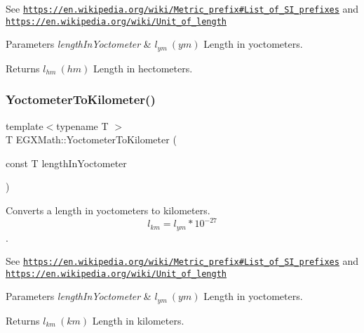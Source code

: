 See \href{https://en.wikipedia.org/wiki/Metric_prefix#List_of_SI_prefixes}{\tt https\+://en.\+wikipedia.\+org/wiki/\+Metric\+\_\+prefix\#\+List\+\_\+of\+\_\+\+S\+I\+\_\+prefixes} and \href{https://en.wikipedia.org/wiki/Unit_of_length}{\tt https\+://en.\+wikipedia.\+org/wiki/\+Unit\+\_\+of\+\_\+length} 
\begin{DoxyParams}{Parameters}
{\em length\+In\+Yoctometer} & $ l_{ym}\ (ym)$ Length in yoctometers. \\
\hline
\end{DoxyParams}
\begin{DoxyReturn}{Returns}
$ l_{hm}\ (hm)$ Length in hectometers. 
\end{DoxyReturn}
\mbox{\label{group___e_g_x_math-_conversions-_length_conversions-_yoctometer-_s_i_ga5736155a6aad5dc3b7b98706bda51484}} 
\subsubsection{\texorpdfstring{Yoctometer\+To\+Kilometer()}{YoctometerToKilometer()}}
{\footnotesize\ttfamily template$<$typename T $>$ \\
T E\+G\+X\+Math\+::\+Yoctometer\+To\+Kilometer (\begin{DoxyParamCaption}\item[{const T}]{length\+In\+Yoctometer }\end{DoxyParamCaption})}



Converts a length in yoctometers to kilometers. \[ l_{km}=l_{ym} * 10^{-27} \]. 

See \href{https://en.wikipedia.org/wiki/Metric_prefix#List_of_SI_prefixes}{\tt https\+://en.\+wikipedia.\+org/wiki/\+Metric\+\_\+prefix\#\+List\+\_\+of\+\_\+\+S\+I\+\_\+prefixes} and \href{https://en.wikipedia.org/wiki/Unit_of_length}{\tt https\+://en.\+wikipedia.\+org/wiki/\+Unit\+\_\+of\+\_\+length} 
\begin{DoxyParams}{Parameters}
{\em length\+In\+Yoctometer} & $ l_{ym}\ (ym)$ Length in yoctometers. \\
\hline
\end{DoxyParams}
\begin{DoxyReturn}{Returns}
$ l_{km}\ (km)$ Length in kilometers. 
\end{DoxyReturn}
\mbox{\label{group___e_g_x_math-_conversions-_length_conversions-_yoctometer-_s_i_ga638081d766f4299ceede9574c1c3242b}} 

